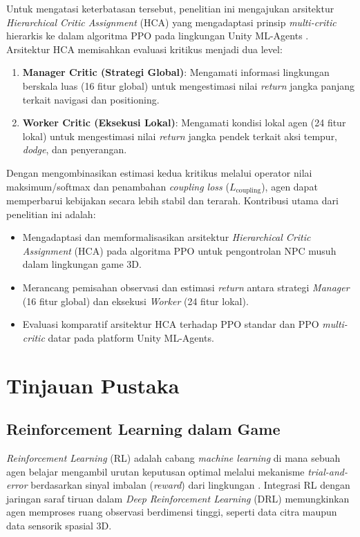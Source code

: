 \documentclass[conference]{IEEEtran}
\begin{document}
Untuk mengatasi keterbatasan tersebut, penelitian ini mengajukan arsitektur \textit{Hierarchical Critic Assignment} (HCA) yang mengadaptasi prinsip \textit{multi-critic} hierarkis \cite{cao2023reinforcement} ke dalam algoritma PPO pada lingkungan Unity ML-Agents \cite{juliani2018unity}. Arsitektur HCA memisahkan evaluasi kritikus menjadi dua level:
\begin{enumerate}
    \item \textbf{Manager Critic (Strategi Global)}: Mengamati informasi lingkungan berskala luas (16 fitur global) untuk mengestimasi nilai \textit{return} jangka panjang terkait navigasi dan positioning.
    \item \textbf{Worker Critic (Eksekusi Lokal)}: Mengamati kondisi lokal agen (24 fitur lokal) untuk mengestimasi nilai \textit{return} jangka pendek terkait aksi tempur, \textit{dodge}, dan penyerangan.
\end{enumerate}

Dengan mengombinasikan estimasi kedua kritikus melalui operator nilai maksimum/softmax dan penambahan \textit{coupling loss} (\(L_{\text{coupling}}\)), agen dapat memperbarui kebijakan secara lebih stabil dan terarah. Kontribusi utama dari penelitian ini adalah:
\begin{itemize}
    \item Mengadaptasi dan memformalisasikan arsitektur \textit{Hierarchical Critic Assignment} (HCA) pada algoritma PPO untuk pengontrolan NPC musuh dalam lingkungan game 3D.
    \item Merancang pemisahan observasi dan estimasi \textit{return} antara strategi \textit{Manager} (16 fitur global) dan eksekusi \textit{Worker} (24 fitur lokal).
    \item Evaluasi komparatif arsitektur HCA terhadap PPO standar dan PPO \textit{multi-critic} datar pada platform Unity ML-Agents.
\end{itemize}

\section{Tinjauan Pustaka}

\subsection{Reinforcement Learning dalam Game}
\textit{Reinforcement Learning} (RL) adalah cabang \textit{machine learning} di mana sebuah agen belajar mengambil urutan keputusan optimal melalui mekanisme \textit{trial-and-error} berdasarkan sinyal imbalan (\textit{reward}) dari lingkungan \cite{sutton2018reinforcement}. Integrasi RL dengan jaringan saraf tiruan dalam \textit{Deep Reinforcement Learning} (DRL) \cite{lecun2015deep} memungkinkan agen memproses ruang observasi berdimensi tinggi, seperti data citra maupun data sensorik spasial 3D.
\end{document}
